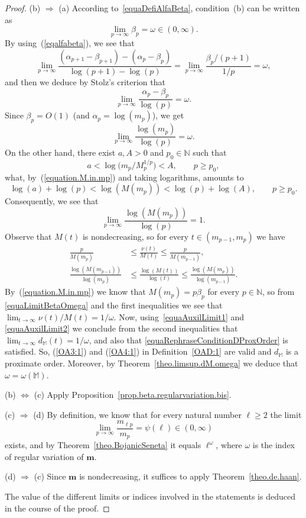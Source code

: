 \documentclass[11pt,a4paper]{article}
\theoremstyle{definition}
\def\oo{\infty}
\def\ri{\rightarrow}
\def\a{\alpha}
\def\b{\beta}
\def\o{\omega}
\def\N{\mathbb{N}}
\def\M{\mathbb{M}}
\def\m{\boldsymbol{m}}
\begin{document}
\begin{proof}
(b) $\Rightarrow$ (a) According to~\eqref{equaDefiAlfaBeta}, condition~(b) can be written as
\begin{equation}\label{equaLimitBetaOmega}
\lim_{p\ri\oo} \b_p=\o\in(0,\oo).
\end{equation}
By using~(\ref{eqalfabeta}), we see that
\begin{equation*}
\lim_{p\ri\oo} \frac{(\a_{p+1}-\b_{p+1})-(\a_p-\b_p)}{\log(p+1)-\log(p)}=\lim_{p\ri\oo} \frac{\b_p/(p+1)}{1/p}=\o,
\end{equation*}
and then we deduce by Stolz's criterion that
\begin{equation*}
\lim_{p\ri\oo} \frac{\a_p-\b_p}{\log(p)}=\o.
\end{equation*}
Since $\beta_p=O(1)$ (and $\a_p=\log(m_p)$), we get
\begin{equation}\label{equaAuxilLimit1}
\lim_{p \ri \oo} \frac{\log(m_p)}{\log(p)}=\o.
\end{equation}
On the other hand, there exist $a,A>0$ and $p_0\in\N$ such that
$$ a<\log\big(m_p/M_p^{1/p}\big)<A,\qquad p\geq p_0,$$
what, by~(\ref{equation.M.in.mp}) and taking logarithms, amounts to
$$ \log(a)+\log(p)<\log(M(m_p))<\log(p)+\log(A),\qquad p\geq p_0.$$
Consequently, we see that
\begin{equation}\label{equaAuxilLimit2}
\lim_{p \ri \oo} \frac{\log (M(m_p))}{\log (p)} =1.
\end{equation}
Observe that $M(t)$ is nondecreasing, so for every $t\in(m_{p-1},m_p)$ we have
\begin{align*}
\frac{p}{M(m_p)}&\leq\frac{\nu(t)}{M(t)}\leq \frac{p}{M(m_{p-1})},\\
\frac{\log(M(m_{p-1}))}{\log(m_{p})}&\leq \frac{\log(M(t))}{\log(t)}\leq \frac{\log(M(m_p))}{\log(m_{p-1})}.
\end{align*}
By~(\ref{equation.M.in.mp}) we know that $M(m_p)=p\b_p$ for every $p\in\N$,
so from \eqref{equaLimitBetaOmega} and the first inequalities we see that
$\lim_{t\to\oo}\nu(t)/M(t)=1/\o$.
Now, using~\eqref{equaAuxilLimit1} and \eqref{equaAuxilLimit2} we conclude from the second inequalities that
$\lim_{t \ri \oo} d_{\M}(t)=1/\o$, and also that \eqref{equaRephraseConditionDProxOrder} is satisfied. So, (\ref{OA3:1}) and (\ref{OA4:1}) in Definition~\ref{OAD:1} are valid and $d_{\M}$ is a proximate order. Moreover, by Theorem~\ref{theo.limsup.dM.omega} we deduce that $\o=\o(\M)$.

 (b) $\Leftrightarrow$ (c) Apply Proposition~\ref{prop.beta.regularvariation.bis}.

 (c) $\Rightarrow$ (d) By definition, we know that for every natural number $\ell\ge 2$ the limit
 $$
 \lim_{p\to\infty}\frac{m_{\ell p}}{m_p}=\psi(\ell)\in(0,\infty)
 $$
 exists, and by Theorem~\ref{theo.BojanicSeneta} it equals $\ell^{\o}$, where $\o$ is the index of regular variation of $\m$.

 (d) $\Rightarrow$ (c) Since $\m$ is nondecreasing, it suffices to apply Theorem~\ref{theo.de.haan}.

The value of the different limits or indices involved in the statements is deduced in the course of the proof.
\end{proof}
\end{document}
